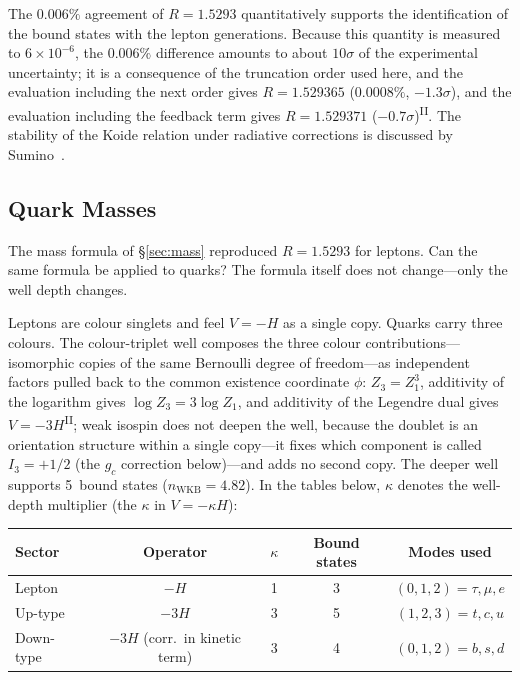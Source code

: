 \documentclass[12pt,a4paper]{article}
\newcommand{\PII}{\textsuperscript{\textup{II}}}
\begin{document}
The $0.006\%$ agreement of $R = 1.5293$ quantitatively supports the identification of the bound states with the lepton generations. Because this quantity is measured to $6 \times 10^{-6}$, the $0.006\%$ difference amounts to about $10\sigma$ of the experimental uncertainty; it is a consequence of the truncation order used here, and the evaluation including the next order gives $R = 1.529365$ ($0.0008\%$, $-1.3\sigma$), and the evaluation including the feedback term gives $R = 1.529371$ ($-0.7\sigma$)\PII{}. The stability of the Koide relation under radiative corrections is discussed by Sumino~\cite{sumino}.


\subsection{Quark Masses}\label{sec:quarks}

The mass formula of \S\ref{sec:mass} reproduced $R = 1.5293$ for leptons.
Can the same formula be applied to quarks?
The formula itself does not change---only the well depth changes.

Leptons are colour singlets and feel $V = -H$ as a single copy.
Quarks carry three colours. The colour-triplet well composes the three colour contributions---isomorphic copies of the same Bernoulli degree of freedom---as independent factors pulled back to the common existence coordinate $\phi$: $Z_3 = Z_1^3$, additivity of the logarithm gives $\log Z_3 = 3\log Z_1$, and additivity of the Legendre dual gives $V = -3H$\PII{}; weak
isospin does not deepen the well, because the doublet is an orientation structure
within a single copy---it fixes which component is called
$I_3 = +1/2$ (the $g_c$ correction below)---and adds no second
copy.
The deeper well supports 5~bound states ($n_\mathrm{WKB} = 4.82$). In the tables below,
$\kappa$ denotes the well-depth multiplier (the $\kappa$ in $V = -\kappa H$):

\begin{center}\small
\begin{tabular}{lcccc}
\toprule
Sector & Operator & $\kappa$ & Bound states & Modes used \\
\midrule
Lepton & $-H$  & 1 & 3 & $(0,1,2) = \tau,\mu,e$ \\
Up-type & $-3H$ & 3 & 5 & $(1,2,3) = t,c,u$ \\
Down-type & $-3H$ (corr.\ in kinetic term) & 3 & 4 & $(0,1,2) = b,s,d$ \\
\bottomrule
\end{tabular}
\end{center}
\end{document}
